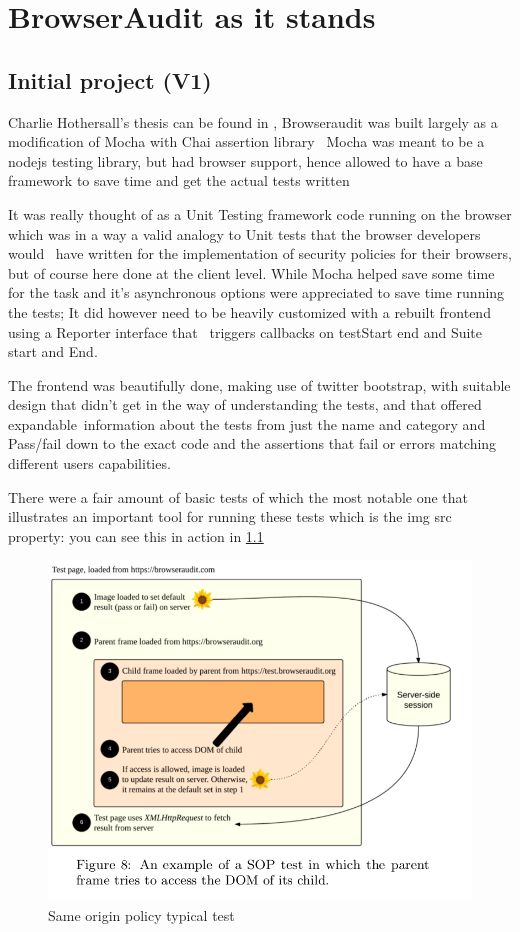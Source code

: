 \chapter{BrowserAudit as it stands}


\section{Initial project (V1)}

Charlie Hothersall's thesis can be found in \cite{charlie} , Browseraudit was built largely as a modification of Mocha with Chai assertion library \
Mocha was meant to be a nodejs testing library, but had browser support, hence allowed to have a base framework to save time and get the actual tests written \

It was really thought of as a Unit Testing framework code running on the browser which was in a way a valid analogy to Unit tests that the browser developers would \
have written for the implementation of security policies for their browsers, but of course here done at the client level. While Mocha helped save some time for the task and
it's asynchronous options were appreciated to save time running the tests; It did however need to be heavily customized with a rebuilt frontend using a Reporter interface that \
triggers callbacks on testStart end and Suite start and End.\ 

The frontend was beautifully done, making use of twitter bootstrap, with suitable design that didn't get in the way of understanding the tests, and that offered expandable\
information about the tests from just the name and category and Pass/fail down to the exact code and the assertions that fail or errors matching different users capabilities.\

There were a fair amount of basic tests of which the most notable one that illustrates an important tool for running these tests which is the img src property:
you can see this in action in \ref{fig:sop} 

\begin{figure}
\centering
\includegraphics[width=1\textwidth]{./SOPbasic.png}
\caption{\label{fig:sop}Same origin policy typical test}
\end{figure}

